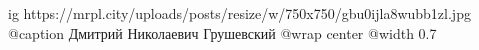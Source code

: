  
 
 
 
 

\ifcmt
  ig https://mrpl.city/uploads/posts/resize/w/750x750/gbu0ijla8wubb1zl.jpg
	@caption Дмитрий Николаевич Грушевский
  @wrap center
  @width 0.7
\fi
